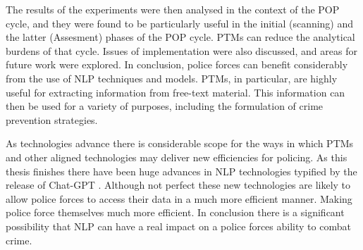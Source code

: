 The results of the experiments were then analysed in the context of the POP cycle, and they were found to be particularly useful in the initial (scanning) and the latter (Assesment) phases of the POP cycle. PTMs can reduce the analytical burdens of that cycle. Issues of implementation were also discussed, and areas for future work were explored. In conclusion, police forces can benefit considerably from the use of NLP techniques and models. PTMs, in particular, are highly useful for extracting information from free-text material. This information can then be used for a variety of purposes, including the formulation of crime prevention strategies.

As technologies advance there is considerable scope for the ways in which PTMs and other aligned technologies may deliver new efficiencies for policing. As this thesis finishes there have been huge advances in NLP technologies typified by the release of Chat-GPT \parencite{vallance_2022}. Although not perfect these new technologies are likely to allow police forces to access their data in a much more efficient manner. Making police force themselves much more efficient. In conclusion there is a significant possibility that NLP can have a real impact on a police forces ability to combat crime.





